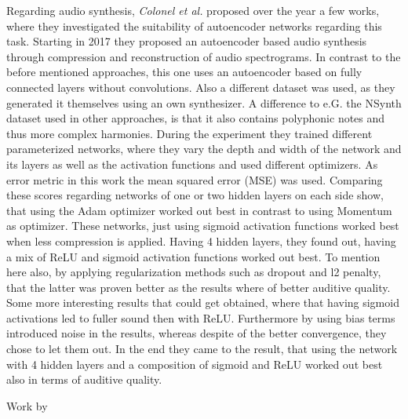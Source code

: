 Regarding audio synthesis, \textit{Colonel et al.} proposed over the year a few works, where they investigated the suitability of autoencoder networks regarding this task. \cite{colonel2017improving, colonel2018autoencoding, Colonel2020} Starting in 2017 they proposed an autoencoder based audio synthesis through compression and reconstruction of audio spectrograms. In contrast to the before mentioned approaches, this one uses an autoencoder based on fully connected layers without convolutions. Also a different dataset was used, as they generated it themselves using an own synthesizer. A difference to e.G. the NSynth dataset used in other approaches, is that it also contains polyphonic notes and thus more complex harmonies. During the experiment they trained different parameterized networks, where they vary the depth and width of the network and its layers as well as the activation functions and used different optimizers. As error metric in this work the mean squared error (MSE) was used. Comparing these scores regarding networks of one or two hidden layers on each side show, that using the Adam optimizer worked out best in contrast to using Momentum as optimizer. These networks, just using sigmoid activation functions worked best when less compression is applied. Having 4 hidden layers, they found out, having a mix of ReLU and sigmoid activation functions worked out best. To mention here also, by applying regularization methods such as dropout and l2 penalty, that the latter was proven better as the results where of better auditive quality. Some more interesting results that could get obtained, where that having sigmoid activations led to fuller sound then with ReLU. Furthermore by using bias terms introduced noise in the results, whereas despite of the better convergence, they chose to let them out. In the end they came to the result, that using the network with 4 hidden layers and a composition of sigmoid and ReLU worked out best also in terms of auditive quality. 

Work by \cite{colonel2017improving, colonel2018autoencoding, Colonel2020, roche2019autoencoders, hantrakul2019fast}

